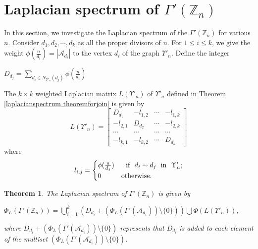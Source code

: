 \documentclass{amsart}
\theoremstyle{plain}
\newtheorem{theorem}{Theorem}[section]
\theoremstyle{definition}
\theoremstyle{remark}
\begin{document}
\section{Laplacian spectrum of $\Gamma'(\mathbb{Z}_n)$}
In this section, we investigate the Laplacian spectrum of the  $\Gamma'(\mathbb{Z}_n)$ for various $n$. Consider $d_1, d_2, \cdots,d_k$ as all the proper divisors of $n$. For $1 \leq i \leq k$, we give the weight $\phi(\frac{n}{d_i}) = |\mathcal{A}_{d_{i}}|$ to the vertex $d_i$ of the graph $\Upsilon'_n$. Define the integer
\begin{center}
    $D_{d_j} =  \sum \limits_{{d_i} \in N_{\Upsilon'_n}(d_j)} \phi(\frac{n}{d_i})$
\end{center}
The $k \times k$ weighted Laplacian matrix $L(\Upsilon'_{n})$ of $\Upsilon'_{n}$ defined in Theorem \ref{laplacianspectrum theoremforjoin} is given by 
\begin{equation}
L(\Upsilon'_{n})  = \displaystyle \begin{bmatrix}\label{spectrum matrix2}
	D_{d_1}&  -l_{1,2} & \cdots & -l_{1,k}  \\
	-l_{2,1}& D_{d_2}   &\cdots&  -l_{2,k} \\ 
 \cdots & \cdots & \cdots & \cdots \\
 -l_{k,1} & -l_{k,2} & \cdots & D_{d_k}
	\end{bmatrix}
\end{equation}
where \[ l_{i,j} = \begin{cases} 
      \phi(\frac{n}{d_j}) & ~~\text{if}~~ d_i \sim d_j~~ \text{in}~~ \Upsilon'_{n};\\
      0 & \rm{otherwise.} 
    \end{cases}
\]

\begin{theorem}\label{laplacianeigenvaluescozero}
The Laplacian spectrum of $\Gamma'(\mathbb{Z}_n)$ is given by \begin{center}
    $\Phi_{L}(\Gamma'(\mathbb{Z}_n)) = \bigcup\limits_{i=1}^{k} (D_{d_i} + (\Phi_{L}(\Gamma'(\mathcal{A}_{d_i})) \setminus \{0\})) \bigcup \Phi(L(\Upsilon'_{n}))$,
\end{center}
where $D_{d_i} + (\Phi_{L}(\Gamma'(\mathcal{A}_{d_i})) \setminus \{0\})$ represents that $D_{d_i}$ is added to each element of the multiset $(\Phi_{L}(\Gamma'(\mathcal{A}_{d_i})) \setminus \{0\})$.
\end{theorem}
\end{document}
